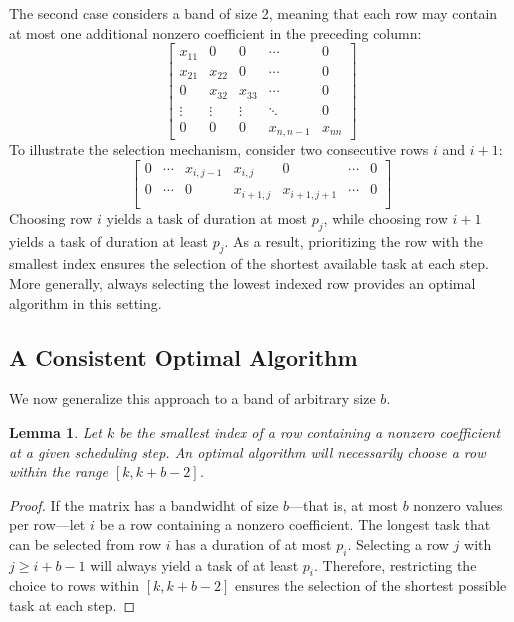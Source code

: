 \documentclass{article}
\newtheorem{lemma}{Lemma}
\begin{document}
The second case considers a band of size 2, meaning that each row may contain at most one additional nonzero coefficient in the preceding column:  
\[
\begin{bmatrix}  
x_{11} & 0 & 0 & \cdots & 0 \\  
x_{21} & x_{22} & 0 & \cdots & 0 \\  
0 & x_{32} & x_{33} & \cdots & 0 \\  
\vdots & \vdots & \vdots & \ddots & 0 \\  
0 & 0 & 0 & x_{n,n-1} & x_{nn}  
\end{bmatrix}  
\]
To illustrate the selection mechanism, consider two consecutive rows $i$ and $i+1$:\[
\begin{bmatrix}  
0 & \cdots & x_{i, j-1} & x_{i,j} & 0 & \cdots & 0 \\  
0 & \cdots & 0 & x_{i+1, j} & x_{i+1, j+1} & \cdots & 0 \\  
\end{bmatrix}  
\]
Choosing row $i$ yields a task of duration at most $p_j$, while choosing row $i+1$ yields a task of duration at least $p_j$. As a result, prioritizing the row with the smallest index ensures the selection of the shortest available task at each step. More generally, always selecting the lowest indexed row provides an optimal algorithm in this setting.
\subsection{A Consistent Optimal Algorithm}\label{band-consistent-algo}

We now generalize this approach to a band of arbitrary size $b$.

\begin{lemma}
Let $k$ be the smallest index of a row containing a nonzero coefficient at a given scheduling step. An optimal algorithm will necessarily choose a row within the range $[k, k + b - 2]$.
\end{lemma}

\begin{proof}
If the matrix has a bandwidht of size $b$—that is, at most $b$ nonzero values per row—let $i$ be a row containing a nonzero coefficient. The longest task that can be selected from row $i$ has a duration of at most $p_i$. Selecting a row $j$ with $j \geq i + b - 1$ will always yield a task of at least $p_i$. Therefore, restricting the choice to rows within $[k, k + b - 2]$ ensures the selection of the shortest possible task at each step.
\end{proof}
\end{document}
